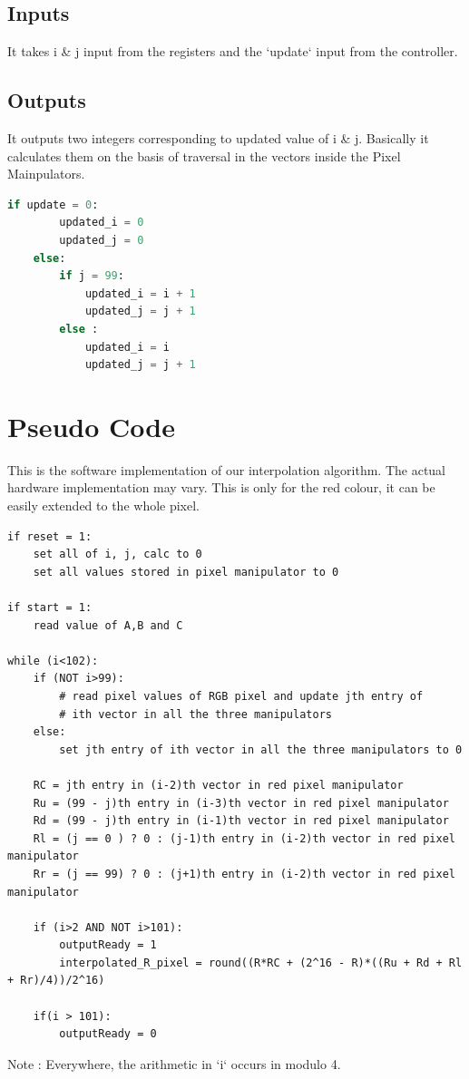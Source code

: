 \documentclass[a4paper,12pt]{article}
\begin{document}
\subsection{Inputs}
\vspace*{-0.2cm}
It takes i \& j input from the registers and the `update` input from the controller.

\subsection{Outputs} 
\vspace*{-0.2cm}
It outputs two integers corresponding to updated value of i \& j. Basically it calculates them on the basis of traversal in the vectors inside the Pixel Mainpulators.
\vspace*{0.2cm}
\begin{lstlisting}[language=Python]
	if update = 0:
		updated_i = 0
		updated_j = 0
	else:
		if j = 99:
			updated_i = i + 1
			updated_j = j + 1
		else :
			updated_i = i
			updated_j = j + 1
\end{lstlisting}

\section{Pseudo Code}
This is the software implementation of our interpolation algorithm. The actual hardware implementation may vary. This is only for the red colour, it can be easily extended to the whole pixel.
\begin{lstlisting}[basicstyle=\tiny]
if reset = 1:
	set all of i, j, calc to 0
	set all values stored in pixel manipulator to 0

if start = 1:
	read value of A,B and C

while (i<102):
	if (NOT i>99):
		# read pixel values of RGB pixel and update jth entry of 
		# ith vector in all the three manipulators
	else:
		set jth entry of ith vector in all the three manipulators to 0

	RC = jth entry in (i-2)th vector in red pixel manipulator 
	Ru = (99 - j)th entry in (i-3)th vector in red pixel manipulator 
	Rd = (99 - j)th entry in (i-1)th vector in red pixel manipulator 
	Rl = (j == 0 ) ? 0 : (j-1)th entry in (i-2)th vector in red pixel manipulator 
	Rr = (j == 99) ? 0 : (j+1)th entry in (i-2)th vector in red pixel manipulator

	if (i>2 AND NOT i>101):
		outputReady = 1
		interpolated_R_pixel = round((R*RC + (2^16 - R)*((Ru + Rd + Rl + Rr)/4))/2^16)

	if(i > 101):
		outputReady = 0
\end{lstlisting}
Note : Everywhere, the arithmetic in `i` occurs in modulo 4.
\clearpage
\end{document}

